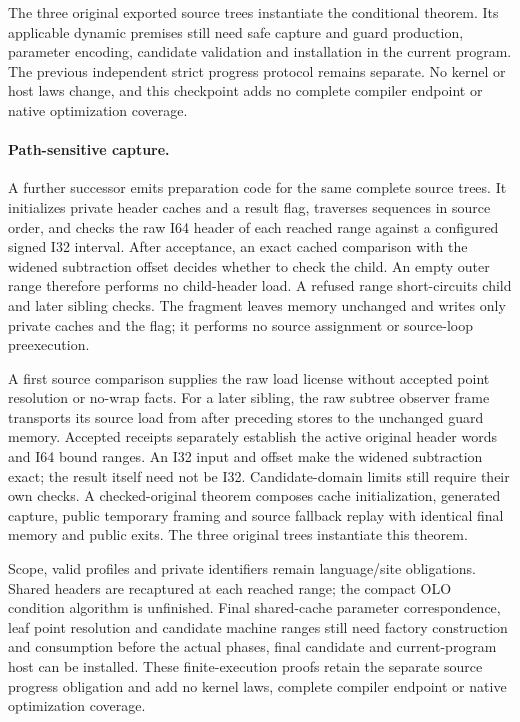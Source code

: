 The three original exported source trees instantiate the conditional theorem.
Its applicable dynamic premises still need safe capture and guard production,
parameter encoding, candidate validation and installation in the current program.
The previous independent strict progress protocol remains separate. No kernel or
host laws change, and this checkpoint adds no complete compiler endpoint or native
optimization coverage.

\paragraph{Path-sensitive capture.}
A further successor emits preparation code for the same complete source trees.
It initializes private header caches and a result flag, traverses sequences in
source order, and checks the raw I64 header of each reached range against a
configured signed I32 interval. After acceptance, an exact cached comparison
with the widened subtraction offset decides whether to check the child.
An empty outer range therefore performs no child-header load. A refused range
short-circuits child and later sibling checks. The fragment leaves memory
unchanged and writes only private caches and the flag; it performs no source
assignment or source-loop preexecution.

A first source comparison supplies the raw load license without accepted point
resolution or no-wrap facts. For a later sibling, the raw subtree observer frame
transports its source load from after preceding stores to the unchanged guard
memory. Accepted receipts separately establish the active original header words
and I64 bound ranges. An I32 input and offset make the widened subtraction exact;
the result itself need not be I32. Candidate-domain limits still require their
own checks. A checked-original theorem composes cache initialization, generated
capture, public temporary framing and source fallback replay with identical final
memory and public exits. The three original trees instantiate this theorem.

Scope, valid profiles and private identifiers remain language/site obligations.
Shared headers are recaptured at each reached range; the compact OLO condition
algorithm is unfinished. Final shared-cache parameter correspondence, leaf point
resolution and candidate machine ranges still need factory construction and
consumption before the actual phases, final candidate and current-program host
can be installed. These finite-execution proofs retain the separate source
progress obligation and add no kernel laws, complete compiler endpoint or native
optimization coverage.

